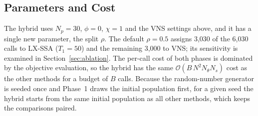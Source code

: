 \subsection{Parameters and Cost}
The hybrid uses $N_p=30$, $\phi=0$, $\chi=1$ and the VNS settings above, and it has a single new parameter, the split $\rho$. The default $\rho=0.5$ assigns 3,030 of the 6,030 calls to LX-SSA ($T_1=50$) and the remaining 3,000 to VNS; its sensitivity is examined in Section~\ref{sec:ablation}. The per-call cost of both phases is dominated by the objective evaluation, so the hybrid has the same $\mathcal O(B\,N^2N_\theta N_s)$ cost as the other methods for a budget of $B$ calls. Because the random-number generator is seeded once and Phase~1 draws the initial population first, for a given seed the hybrid starts from the same initial population as all other methods, which keeps the comparisons paired.

